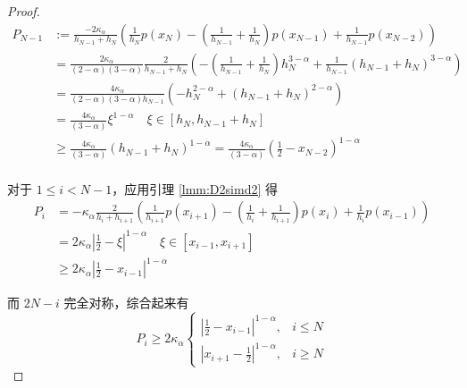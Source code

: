 \documentclass{ctexart}
\theoremstyle{definition}
\theoremstyle{remark}
\numberwithin{equation}{section}
\begin{document}
\begin{proof}
    \begin{equation}
        \begin{aligned}
            P_{N-1} & := \frac{-2\kappa_\alpha}{h_{N-1} + h_{N}}
            \left( \frac{1}{h_{N}} p(x_{N})
            - (\frac{1}{h_{N-1}}+\frac{1}{h_{N}}) p(x_{N-1})
            +  \frac{1}{h_{N-1}} p(x_{N-2}) \right)                                                                                           \\
                    & = \frac{2 \kappa_\alpha}{(2-\alpha)(3-\alpha)} \frac{2}{h_{N-1} + h_{N}}
            \left( - (\frac{1}{h_{N-1}}+\frac{1}{h_{N}}) h_N^{3-\alpha}
            +  \frac{1}{h_{N-1}} (h_{N-1}+h_{N})^{3-\alpha} \right)                                                                           \\
                    & = \frac{4 \kappa_\alpha}{(2-\alpha)(3-\alpha) h_{N-1}}
            \left( - h_{N}^{2-\alpha}
            +  (h_{N-1}+h_{N})^{2-\alpha} \right)                                                                                             \\
                    & = \frac{4 \kappa_\alpha}{(3-\alpha)} \xi^{1-\alpha}    \quad \xi \in [h_N, h_{N-1}+h_{N}]                                        \\
                    & \ge \frac{4 \kappa_\alpha}{(3-\alpha)} (h_{N-1}+h_{N})^{1-\alpha} = \frac{4 \kappa_\alpha}{(3-\alpha)} (\frac{1}{2} - x_{N-2})^{1-\alpha} \\
        \end{aligned}
    \end{equation}

    对于 \(1\le i<N-1\)，应用引理 \ref{lmm:D2simd2} 得
    \begin{equation}
        \begin{aligned}
            P_{i} & = -\kappa_\alpha\frac{2}{h_i + h_{i+1}}
            \left( \frac{1}{h_{i+1}} p(x_{i+1})
            - (\frac{1}{h_{i}}+\frac{1}{h_{i+1}}) p(x_{i})
            +  \frac{1}{h_{i}} p(x_{i-1}) \right)       \\
            & = 2 \kappa_\alpha |\frac{1}{2} - \xi|^{1-\alpha}  \quad \xi \in [x_{i-1}, x_{i+1}] \\
                  & \ge 2 \kappa_\alpha |\frac{1}{2} - x_{i-1}|^{1-\alpha}
        \end{aligned}
    \end{equation}

    而 \(2N-i\) 完全对称，综合起来有
    \begin{equation}
        P_i \ge 2\kappa_\alpha \begin{cases}
            |\frac{1}{2} - x_{i-1}|^{1-\alpha} , & i\le N \\
            |x_{i+1} - \frac{1}{2}|^{1-\alpha} , & i\ge N
        \end{cases}
    \end{equation}



\end{proof}
\end{document}
